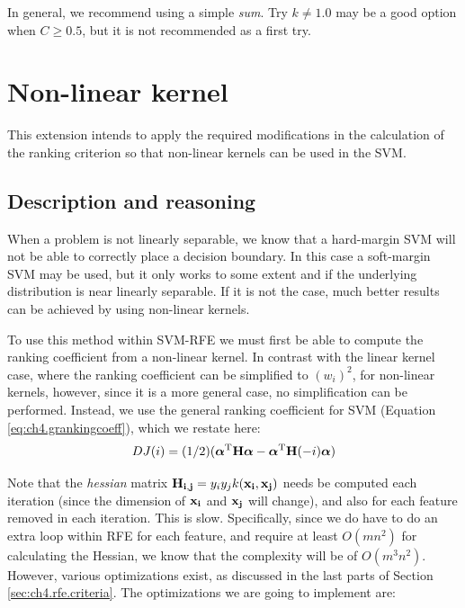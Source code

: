 In general, we recommend using a simple \emph{sum}. Try $k \neq 1.0$ may be a good option when $C \ge 0.5$, but it is not recommended as a first try. 


\section{Non-linear kernel}

This extension intends to apply the required modifications in the calculation of the ranking criterion so that non-linear kernels can be used in the SVM.

\subsection{Description and reasoning}
\label{sec:ch5.kernel.desc}

When a problem is not linearly separable, we know that a hard-margin SVM will not be able to correctly place a decision boundary. In this case a soft-margin SVM may be used, but it only works to some extent and if the underlying distribution is near linearly separable. If it is not the case, much better results can be achieved by using non-linear kernels.

To use this method within SVM-RFE we must first be able to compute the ranking coefficient from a non-linear kernel. In contrast with the linear kernel case, where the ranking coefficient can be simplified to $(w_i)^2$, for non-linear kernels, however, since it is a more general case, no simplification can be performed. Instead, we use the general ranking coefficient for SVM (Equation \ref{eq:ch4.grankingcoeff}), which we restate here:
\begin{align*}
    DJ(i) = (1/2)(\boldsymbol{\alpha}^{\text{T}} \mathbf{H} \boldsymbol{\alpha} - \boldsymbol{\alpha}^{\text{T}} \mathbf{H}(-i) \boldsymbol{\alpha})
\end{align*}

Note that the \emph{hessian} matrix $\mathbf{H_{i,j}} = y_iy_jk(\mathbf{x_i}, \mathbf{x_j})$ needs be computed each iteration (since the dimension of $\mathbf{x_i}$ and $\mathbf{x_j}$ will change), and also for each feature removed in each iteration. This is slow. Specifically, since we do have to do an extra loop within RFE for each feature, and require at least $O(mn^2)$ for calculating the Hessian, we know that the complexity will be of $O(m^3n^2)$. However, various optimizations exist, as discussed in the last parts of Section \ref{sec:ch4.rfe.criteria}. The optimizations we are going to implement are:

